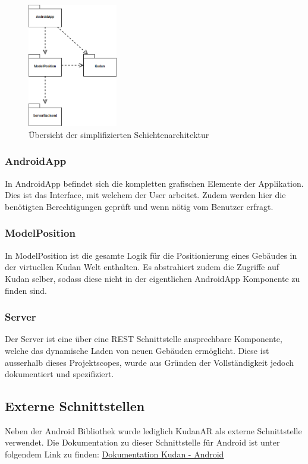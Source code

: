 \documentclass[a4paper]{scrreprt}
\begin{document}
\begin{figure}[h!]
  \center
  \includegraphics[width=0.35\textwidth]{SchichtenDiagramm.png}
  \caption{Übersicht der simplifizierten Schichtenarchitektur}
\end{figure}

\subsubsection{AndroidApp}
In AndroidApp befindet sich die kompletten grafischen Elemente der Applikation. Dies ist das Interface, mit welchem der User arbeitet. Zudem werden hier die benötigten Berechtigungen geprüft und wenn nötig vom Benutzer erfragt.

\subsubsection{ModelPosition}
In ModelPosition ist die gesamte Logik für die Positionierung eines Gebäudes in der virtuellen Kudan Welt enthalten. Es abstrahiert zudem die Zugriffe auf Kudan selber, sodass diese nicht in der eigentlichen AndroidApp Komponente zu finden sind.

\subsubsection{Server}
Der Server ist eine über eine REST Schnittstelle ansprechbare Komponente, welche das dynamische Laden von neuen Gebäuden ermöglicht. Diese ist ausserhalb dieses Projektscopes, wurde aus Gründen der Vollständigkeit jedoch dokumentiert und spezifiziert.

\subsection{Externe Schnittstellen}
Neben der Android Bibliothek wurde lediglich KudanAR als externe Schnittstelle verwendet. Die Dokumentation zu dieser Schnittstelle für Android ist unter folgendem Link zu finden:
\href{https://www.kudan.eu/docs-reference/AndroidDocs/annotated.html}{Dokumentation Kudan - Android}
\end{document}
